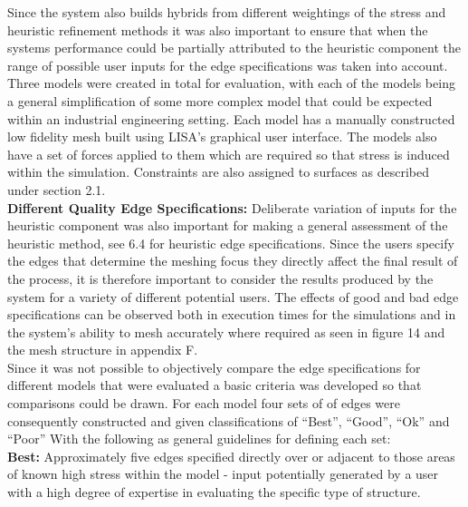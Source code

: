 \noindent
Since the system also builds hybrids from different weightings of the stress and heuristic refinement methods it was also important to ensure that when the systems performance could be partially attributed to the heuristic component the range of possible user inputs for the edge specifications was taken into account. \\  

\noindent
Three models were created in total for evaluation, with each of the models being a general simplification of some more complex model that could be expected within an industrial engineering setting. Each model has a manually constructed low fidelity mesh built using LISA's graphical user interface. The models also have a set of forces applied to them which are required so that stress is induced within the simulation. Constraints are also assigned to surfaces as described under section 2.1. \\ 


\noindent
\textbf{Different Quality Edge Specifications: } Deliberate variation of inputs for the heuristic component was also important for making a general assessment of the heuristic method, see 6.4 for heuristic edge specifications. Since the users specify the edges that determine the meshing focus they directly affect the final result of the process, it is therefore important to consider the results produced by the system for a variety of different potential users. The effects of good and bad edge specifications can be observed both in execution times for the simulations and in the system's ability to mesh accurately where required as seen in figure 14 and the mesh structure in appendix F. \\ 

\noindent
Since it was not possible to objectively compare the edge specifications for different models that were evaluated a basic criteria was developed so that comparisons could be drawn. For each model four sets of of edges were consequently constructed and given classifications of ``Best'', ``Good'', ``Ok'' and ``Poor'' With the following as general guidelines for defining each set: \\

\noindent
\textbf{Best: } Approximately five edges specified directly over or adjacent to those areas of known high stress within the model - input potentially generated by a user with a high degree of expertise in evaluating the specific type of structure. \\ 

